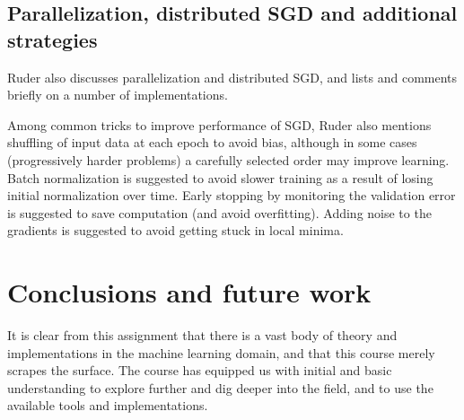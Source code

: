 \documentclass[a4paper]{article}
\begin{document}
\subsection{Parallelization, distributed SGD and additional strategies}
Ruder also discusses parallelization and distributed SGD, and lists and comments briefly on a number of implementations.

Among common tricks to improve performance of SGD, Ruder also mentions shuffling of input data at each epoch to avoid bias, although in some cases (progressively harder problems) a carefully selected order may improve learning.
Batch normalization is suggested to avoid slower training as a result of losing initial normalization over time.
Early stopping by monitoring the validation error is suggested to save computation (and avoid overfitting).
Adding noise to the gradients is suggested to avoid getting stuck in local minima.

\section{Conclusions and future work}
It is clear from this assignment that there is a vast body of theory and implementations in the machine learning domain, and that this course merely scrapes the surface. The course has equipped us with initial and basic understanding to explore further and dig deeper into the field, and to use the available tools and implementations.  

\printbibliography
\end{document}
